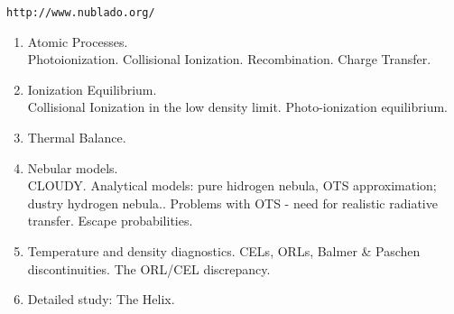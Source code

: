 
\renewcommand\normalcolor{\color{yellow}}  %
\renewcommand\Black{\color{white}}        %
\color{white}                             %


\LogoOff
\bgclear

\vspace{-1cm}
\begin{center}
{\tt http://www.nublado.org/ }
\end{center}
\vspace{-1cm}
\begin{enumerate}
\item Atomic Processes.\\ 
Photoionization. Collisional Ionization. Recombination. Charge
Transfer. \label{item:processes}
\item Ionization Equilibrium. \\ 
Collisional Ionization in the low density limit. Photo-ionization
equilibrium.    \label{item:equi}
\item Thermal Balance.  \label{item:balance}
\item Nebular models. \\ CLOUDY. Analytical models:
pure hidrogen nebula, OTS approximation; dustry hydrogen nebula..
Problems with OTS - need for realistic radiative transfer. Escape
probabilities.  \label{item: models}
\item Temperature and density diagnostics. CELs, ORLs,
 Balmer \& Paschen discontinuities. The ORL/CEL discrepancy. \label{item: diag}
\item Detailed study: The Helix. \label{item:example}
\end{enumerate} 



\renewcommand\labelitemi{\textcolor{blue}{$\bullet$}}  
\renewcommand\normalcolor{\color{blue}}  %


\renewcommand\labelitemi{\textcolor{blue}{$\bullet$}}  
\renewcommand\Black{\color{black}}        %
\renewcommand\labelitemii{\textcolor{DarkGreen}{$\star$}}  
\color{black}                             %

